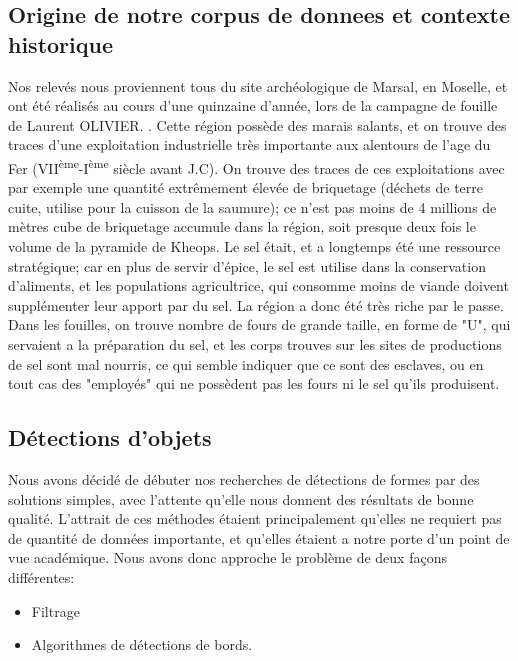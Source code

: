 \documentclass[a4paper, 12pt, titlepage, oneside, french]{article}
\begin{document}
	\subsection{Origine de notre corpus de donnees et contexte historique}
	
	Nos relevés nous proviennent tous du site archéologique de Marsal, en Moselle, et ont été réalisés au cours d'une quinzaine d'année, lors de la campagne de fouille de Laurent OLIVIER.%
	. Cette région possède des marais salants, et on trouve des traces d'une exploitation industrielle très importante aux alentours de l'age du Fer (VII\textsuperscript{ème}-I\textsuperscript{ème} siècle avant J.C). On trouve des traces de ces exploitations avec par exemple une quantité extrêmement élevée de briquetage (déchets de terre cuite, utilise pour la cuisson de la saumure); ce n'est pas moins de 4 millions de mètres cube de briquetage accumule dans la région, soit presque deux fois le volume de la pyramide de Kheops. Le sel était, et a longtemps été une ressource stratégique; car en plus de servir d'épice, le sel est utilise dans la conservation d'aliments, et les populations agricultrice, qui consomme moins de viande doivent supplémenter leur apport par du sel. La région a donc été très riche par le passe. Dans les fouilles, on trouve nombre de fours de grande taille, en forme de "U", qui servaient a la préparation du sel, et les corps trouves sur les sites de productions de sel sont mal nourris, ce qui semble indiquer que ce sont des esclaves, ou en tout cas des "employés" qui ne possèdent pas les fours ni le sel qu'ils produisent. %

	\newpage
	\subsection{Détections d'objets}
	Nous avons décidé de débuter nos recherches de détections de formes par des solutions simples, avec l'attente qu'elle nous donnent des résultats de bonne qualité. L'attrait de ces méthodes étaient principalement qu'elles ne requiert pas de quantité de données importante, et qu'elles étaient a notre porte d'un point de vue académique. Nous avons donc approche le problème de deux façons différentes:
	\begin{itemize}
		\item Filtrage
		\item Algorithmes de détections de bords.
	\end{itemize}
\end{document}
